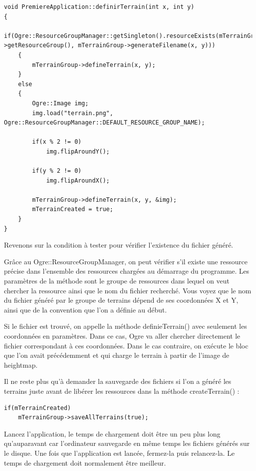 \documentclass[10pt,a4paper]{report}
\begin{document}
\begin{lstlisting}[caption={}]
void PremiereApplication::definirTerrain(int x, int y)
{
    if(Ogre::ResourceGroupManager::getSingleton().resourceExists(mTerrainGroup->getResourceGroup(), mTerrainGroup->generateFilename(x, y)))
    {
        mTerrainGroup->defineTerrain(x, y);
    }
    else
    {
        Ogre::Image img;
        img.load("terrain.png", Ogre::ResourceGroupManager::DEFAULT_RESOURCE_GROUP_NAME);

        if(x % 2 != 0)
            img.flipAroundY();

        if(y % 2 != 0)
            img.flipAroundX();

        mTerrainGroup->defineTerrain(x, y, &img);
        mTerrainCreated = true;
    }
}
\end{lstlisting}

Revenons sur la condition \`a tester pour v\'erifier l'existence du fichier g\'en\'er\'e.

Gr\^ace au Ogre::ResourceGroupManager, on peut v\'erifier s'il existe une ressource pr\'ecise dans l'ensemble des ressources charg\'ees au d\'emarrage du programme. Les param\`etres de la m\'ethode sont le groupe de ressources dans lequel on veut chercher la ressource ainsi que le nom du fichier recherch\'e. Vous voyez que le nom du fichier g\'en\'er\'e par le groupe de terrains d\'epend de ses coordonn\'ees X et Y, ainsi que de la convention que l'on a d\'efinie au d\'ebut.

Si le fichier est trouv\'e, on appelle la m\'ethode definieTerrain() avec seulement les coordonn\'ees en param\`etres. Dans ce cas, Ogre va aller chercher directement le fichier correspondant \`a ces coordonn\'ees. Dans le cas contraire, on ex\'ecute le bloc que l'on avait pr\'ec\'edemment et qui charge le terrain \`a partir de l'image de heightmap.

Il ne reste plus qu'\`a demander la sauvegarde des fichiers si l'on a g\'en\'er\'e les terrains juste avant de lib\'erer les ressources dans la m\'ethode createTerrain() :

\begin{lstlisting}[caption={}]
if(mTerrainCreated)
    mTerrainGroup->saveAllTerrains(true);
\end{lstlisting}


Lancez l'application, le temps de chargement doit \^etre un peu plus long qu'auparavant car l'ordinateur sauvegarde en m\^eme temps les fichiers g\'en\'er\'es sur le disque. Une fois que l'application est lanc\'ee, fermez-la puis relancez-la. Le temps de chargement doit normalement \^etre meilleur.
\end{document}
